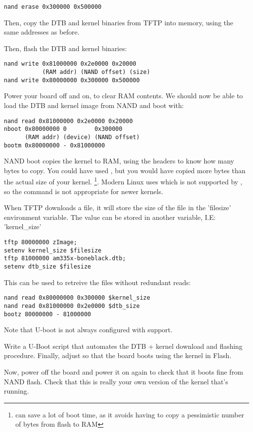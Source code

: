 \begin{verbatim}
nand erase 0x300000 0x500000
\end{verbatim}

Then, copy the DTB and kernel binaries from TFTP into memory, using the
same addresses as before.

Then, flash the DTB and kernel binaries:

\begin{verbatim}
nand write 0x81000000 0x2e0000 0x20000
           (RAM addr) (NAND offset) (size)
nand write 0x80000000 0x300000 0x500000
\end{verbatim}

Power your board off and on, to clear RAM contents. We should now be
able to load the DTB and kernel image from NAND and boot with:

\begin{verbatim}
nand read 0x81000000 0x2e0000 0x20000
nboot 0x80000000 0        0x300000
      (RAM addr) (device) (NAND offset)
bootm 0x80000000 - 0x81000000
\end{verbatim}

NAND boot  copies the kernel to RAM, using the  headers
to know how many bytes to copy. You could have used , but you would have copied more bytes than
the actual size of your kernel. \footnote{ can save a lot 
of boot time, as it avoids having to copy a pessimistic number of
bytes from flash to RAM}. Modern Linux uses  which is not
supported by , so the command is not appropriate for newer kernels.

When TFTP downloads a file, it will store the size of the file in the 'filesize'
environment variable. The value can be stored in another variable, I.E: 'kernel\_size'

\begin{verbatim}
tftp 80000000 zImage; 
setenv kernel_size $filesize
tftp 81000000 am335x-boneblack.dtb; 
setenv dtb_size $filesize
\end{verbatim}

This can be used to retreive the files without redundant reads:

\begin{verbatim}
nand read 0x80000000 0x300000 $kernel_size
nand read 0x81000000 0x2e0000 $dtb_size
bootz 80000000 - 81000000
\end{verbatim}

Note that U-boot is not always configured
with  support.

Write a U-Boot script that automates the DTB + kernel download
and flashing procedure. Finally, adjust  so that
the board boots using the kernel in Flash.

Now, power off the board and power it on again to check that it boots
fine from NAND flash. Check that this is really your own version of
the kernel that's running.
